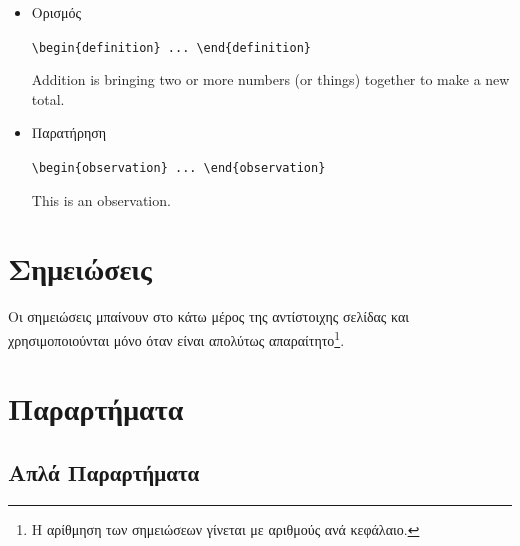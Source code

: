 \begin{itemize}
	\begin{center}\verb"\begin{remark} ... \end{remark}"\end{center}
	
	\begin{remark}
	This is a remark.
	\end{remark}
	
	\item Ορισμός
	
	\begin{center}\verb"\begin{definition} ... \end{definition}"\end{center}
	
	\begin{definition}
	Addition is bringing two or more numbers (or things) together to make a
	new total.
	\end{definition}
	
	\item Παρατήρηση
	
	\begin{center}\verb"\begin{observation} ... \end{observation}"\end{center}
	
	\begin{observation}
	This is an observation.
	\end{observation}
\end{itemize}



\section{Σημειώσεις}
\label{sec:Footnotes}

Οι σημειώσεις μπαίνουν στο κάτω μέρος της αντίστοιχης σελίδας και
χρησιμοποιούνται μόνο όταν είναι απολύτως απαραίτητο\footnote{Η
αρίθμηση των σημειώσεων γίνεται με αριθμούς ανά κεφάλαιο.}.




\section{Παραρτήματα}
\label{sec:Appendices}

\subsection{Απλά Παραρτήματα}
\label{subsec:SimpleAppendices}

